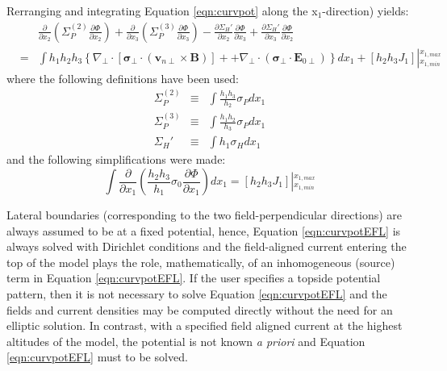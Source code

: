 \documentclass[11pt,letterpaper]{article}
\begin{document}
 Rerranging and integrating Equation \ref{eqn:curvpot} along the x$_1$-direction) yields:
\begin{eqnarray}
&~& \frac{\partial}{\partial x_2} \left( \Sigma_P^{(2)} \frac{\partial \Phi}{\partial x_2} \right) + \frac{\partial}{\partial x_3} \left( \Sigma_P^{(3)} \frac{\partial \Phi}{\partial x_3} \right) -  \frac{\partial \Sigma_H'}{\partial x_2} \frac{\partial \Phi}{\partial x_3} + \frac{\partial \Sigma_H'}{\partial x_3} \frac{\partial \Phi}{\partial x_2} \nonumber \\ &=& \int h_1 h_2 h_3 \left\{ \nabla_\perp \cdot \left[ \boldsymbol{\sigma}_\perp \cdot \left( \mathbf{v}_{n\perp} \times \mathbf{B} \right) \right] + + \nabla_\perp \cdot \left( \boldsymbol{\sigma}_\perp \cdot \mathbf{E}_{0\perp} \right) \right\} d x_1 + \left[ h_2 h_3 J_1 \right] \left|^{x_{1,max}}_{x_{1,min}} \right. \label{eqn:curvpotEFL}
\end{eqnarray}
where the following definitions have been used:
\begin{eqnarray}
\Sigma_P^{(2)} &\equiv& \int \frac{h_1 h_3}{h_2} \sigma_P dx_1 \\
\Sigma_P^{(3)} &\equiv& \int \frac{h_1 h_2}{h_3} \sigma_P dx_1 \\
\Sigma_H' &\equiv& \int h_1 \sigma_H dx_1 
\end{eqnarray}
and the following simplifications were made:
\begin{equation}
\int \frac{\partial}{\partial x_1} \left( \frac{h_2 h_3}{h_1} \sigma_0 \frac{\partial \Phi}{\partial x_1} \right) d x_1= \left[ h_2 h_3 J_1 \right] \left|^{x_{1,max}}_{x_{1,min}} \right.
\end{equation}

Lateral boundaries (corresponding to the two field-perpendicular directions) are always assumed to be at a fixed potential, hence, Equation \ref{eqn:curvpotEFL} is always solved with Dirichlet conditions and the field-aligned current entering the top of the model plays the role, mathematically, of an inhomogeneous (source) term in Equation \ref{eqn:curvpotEFL}.  If the user specifies a topside potential pattern, then it is not necessary to solve Equation \ref{eqn:curvpotEFL} and the fields and current densities may be computed directly without the need for an elliptic solution.  In contrast, with a specified field aligned current at the highest altitudes of the model, the potential is not known \emph{a priori} and Equation \ref{eqn:curvpotEFL} must to be solved.  %
\end{document}
